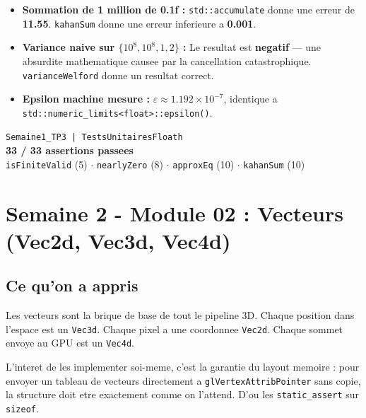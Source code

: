 \documentclass[12pt,a4paper]{report}
\newcommand{\code}[1]{\texttt{\textcolor{PrimaryBlue}{#1}}}
\begin{document}
\begin{tpbox}
\begin{itemize}
  \item \textbf{Sommation de 1 million de 0.1f :}
        \code{std::accumulate} donne une erreur de \textbf{11.55}.
        \code{kahanSum} donne une erreur inferieure a \textbf{0.001}.
  \item \textbf{Variance naive sur $\{10^8, 10^8, 1, 2\}$ :}
        Le resultat est \textbf{negatif} --- une absurdite mathematique causee par la cancellation catastrophique.
        \code{varianceWelford} donne un resultat correct.
  \item \textbf{Epsilon machine mesure :} $\varepsilon \approx 1.192 \times 10^{-7}$,
        identique a \code{std::numeric\_limits<float>::epsilon()}.
\end{itemize}
\end{tpbox}

\begin{tpbox}
\begin{resultbox}
\centering
\texttt{Semaine1\_TP3 | TestsUnitairesFloath}\\[4pt]
\textbf{33 / 33 assertions passees}\\[2pt]
\texttt{isFiniteValid} (5) $\cdot$ \texttt{nearlyZero} (8) $\cdot$ \texttt{approxEq} (10) $\cdot$ \texttt{kahanSum} (10)
\end{resultbox}
\end{tpbox}

\chapter{Semaine 2 - Module 02 : Vecteurs (Vec2d, Vec3d, Vec4d)}

\section{Ce qu'on a appris}

Les vecteurs sont la brique de base de tout le pipeline 3D. Chaque position dans l'espace est un \code{Vec3d}. Chaque pixel a une coordonnee \code{Vec2d}. Chaque sommet envoye au GPU est un \code{Vec4d}.

L'interet de les implementer soi-meme, c'est la garantie du layout memoire : pour envoyer un tableau de vecteurs directement a \code{glVertexAttribPointer} sans copie, la structure doit etre exactement comme on l'attend. D'ou les \code{static\_assert} sur \code{sizeof}.
\end{document}
